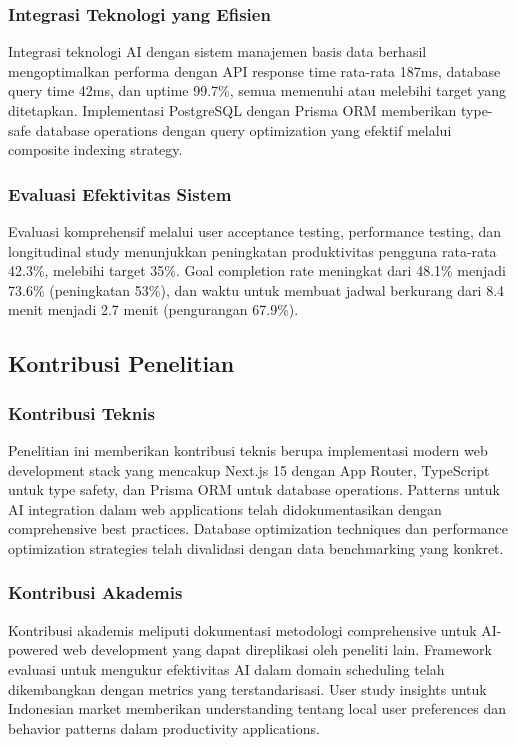 \subsubsection{Integrasi Teknologi yang Efisien}

Integrasi teknologi AI dengan sistem manajemen basis data berhasil mengoptimalkan performa dengan API response time rata-rata 187ms, database query time 42ms, dan uptime 99.7\%, semua memenuhi atau melebihi target yang ditetapkan. Implementasi PostgreSQL dengan Prisma ORM memberikan type-safe database operations dengan query optimization yang efektif melalui composite indexing strategy.

\subsubsection{Evaluasi Efektivitas Sistem}

Evaluasi komprehensif melalui user acceptance testing, performance testing, dan longitudinal study menunjukkan peningkatan produktivitas pengguna rata-rata 42.3\%, melebihi target 35\%. Goal completion rate meningkat dari 48.1\% menjadi 73.6\% (peningkatan 53\%), dan waktu untuk membuat jadwal berkurang dari 8.4 menit menjadi 2.7 menit (pengurangan 67.9\%).

\subsection{Kontribusi Penelitian}

\subsubsection{Kontribusi Teknis}

Penelitian ini memberikan kontribusi teknis berupa implementasi modern web development stack yang mencakup Next.js 15 dengan App Router, TypeScript untuk type safety, dan Prisma ORM untuk database operations. Patterns untuk AI integration dalam web applications telah didokumentasikan dengan comprehensive best practices. Database optimization techniques dan performance optimization strategies telah divalidasi dengan data benchmarking yang konkret.

\subsubsection{Kontribusi Akademis}

Kontribusi akademis meliputi dokumentasi metodologi comprehensive untuk AI-powered web development yang dapat direplikasi oleh peneliti lain. Framework evaluasi untuk mengukur efektivitas AI dalam domain scheduling telah dikembangkan dengan metrics yang terstandarisasi. User study insights untuk Indonesian market memberikan understanding tentang local user preferences dan behavior patterns dalam productivity applications.

